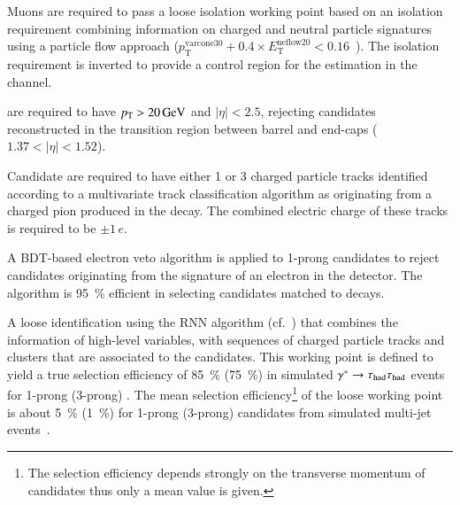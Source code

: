 \begin{description}
  Muons are required to pass a loose isolation working point based on
  an isolation requirement combining information on charged and
  neutral particle signatures using a particle flow approach
  ($p_{\text{T}}^{\text{varcone30}} + 0.4 \times
  E_{\text{T}}^{\text{neflow20}} < 0.16$~\cite{MUON-2018-03}). The
  isolation requirement is inverted to provide a control region for
  the \faketauhadvis estimation in the \lephad channel.




\item[\tauhadvis] are required to have $\pT > \SI{20}{\GeV}$ and
  $|\eta| < 2.5$, rejecting candidates reconstructed in the transition
  region between barrel and end-caps ($1.37 < |\eta| < 1.52$).

  Candidate \tauhadvis are required to have either 1 or 3 charged
  particle tracks identified according to a multivariate track
  classification algorithm as originating from a charged pion produced
  in the \taulepton decay. The combined electric charge of these
  tracks is required to be $\pm 1\,e$.

  A BDT-based electron veto algorithm is applied to 1-prong \tauhadvis
  candidates to reject candidates originating from the signature of an
  electron in the detector. The algorithm is \SI{95}{\percent}
  efficient in selecting \tauhadvis candidates matched to \tauhad
  decays.

  A loose \tauhadvis identification using the RNN algorithm
  (cf.~) that combines the information of high-level
  variables, with sequences of charged particle tracks and clusters
  that are associated to the \tauhadvis candidates. This working point
  is defined to yield a true \tauhadvis selection efficiency of
  \SI{85}{\percent} (\SI{75}{\percent}) in simulated
  $\gamma^* \to \tau_{\text{had}}\tau_{\text{had}}$ events for 1-prong (3-prong)
  \tauhadvis. The mean \faketauhadvis selection
  efficiency\footnote{The \faketauhadvis selection efficiency depends
    strongly on the transverse momentum of \tauhadvis candidates thus
    only a mean value is given.} of the loose working point is about
  \SI{5}{\percent} (\SI{1}{\percent}) for 1-prong (3-prong) \tauhadvis
  candidates from simulated multi-jet
  events~\cite{ATL-PHYS-PUB-2019-033}.


\end{description}
